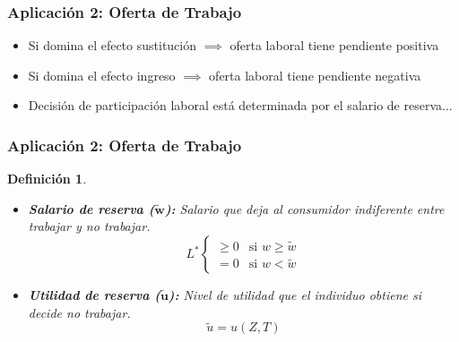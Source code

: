 \documentclass{beamer}
\newtheorem{mydef}{Definición}
\newcommand{\peq}[1]{{\scriptscriptstyle{#1}}}
\begin{document}
		\begin{frame}
			\frametitle{Aplicación 2: Oferta de Trabajo}
			\begin{itemize}
				\item Si domina el efecto sustitución $\implies$ oferta laboral tiene pendiente positiva
				\item Si domina el efecto ingreso $\implies$ oferta laboral tiene pendiente negativa
				\item Decisión de participación laboral está determinada por el salario de reserva...
			\end{itemize}
		\end{frame}	

		\begin{frame}
			\frametitle{Aplicación 2: Oferta de Trabajo}
			\begin{mydef}
				\begin{itemize}
					\item \textbf{Salario de reserva ($\mathbf{\tilde{w}}$):} Salario que deja al consumidor indiferente entre trabajar y no trabajar. $$L^\peq{*}\left\{
								\begin{array}{ll}
									\geq 0 & \mbox{si } w \geq \tilde{w} \\
									 = 0	 & \mbox{si } w < \tilde{w} 
								\end{array}
							\right.$$
					\item \textbf{Utilidad de reserva ($\mathbf{\tilde{u}}$):} Nivel de utilidad que el individuo obtiene si decide no trabajar. $$\tilde{u}=u(Z,T)$$
				\end{itemize}
			\end{mydef}
		\end{frame}	
\end{document}
